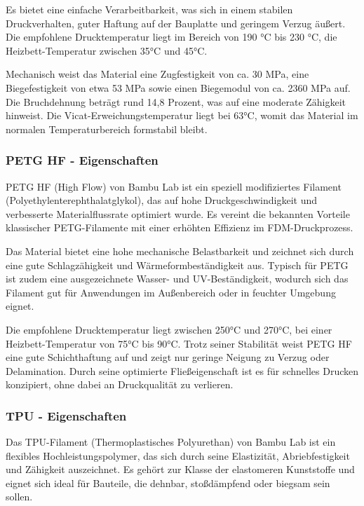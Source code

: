 \documentclass[a4paper,12pt]{article}
\begin{document}
Es bietet eine einfache Verarbeitbarkeit, was sich in einem stabilen Druckverhalten, guter Haftung auf der Bauplatte und geringem Verzug äußert. Die empfohlene Drucktemperatur liegt im Bereich von 190 °C bis 230 °C, die Heizbett-Temperatur zwischen 35°C und 45°C.

Mechanisch weist das Material eine Zugfestigkeit von ca. 30 MPa, eine Biegefestigkeit von etwa 53 MPa sowie einen Biegemodul von ca. 2360 MPa auf. Die Bruchdehnung beträgt rund 14,8 Prozent, was auf eine moderate Zähigkeit hinweist. \newline Die Vicat-Erweichungstemperatur liegt bei 63°C, womit das Material im normalen Temperaturbereich formstabil bleibt.\cite{Bambu_Lab_Filament_PLA}


\subsubsection{PETG HF - Eigenschaften}
\label{sec:PETG HF}

PETG HF (High Flow) von Bambu Lab ist ein speziell modifiziertes Filament (Polyethylenterephthalatglykol), das auf hohe Druckgeschwindigkeit und verbesserte Materialflussrate optimiert wurde. Es vereint die bekannten Vorteile klassischer PETG-Filamente mit einer erhöhten Effizienz im FDM-Druckprozess.

Das Material bietet eine hohe mechanische Belastbarkeit und zeichnet sich durch eine gute Schlagzähigkeit und Wärmeformbeständigkeit aus. Typisch für PETG ist zudem eine ausgezeichnete Wasser- und UV-Beständigkeit, wodurch sich das Filament gut für Anwendungen im Außenbereich oder in feuchter Umgebung eignet.

Die empfohlene Drucktemperatur liegt zwischen 250°C und 270°C, bei einer Heizbett-Temperatur von 75°C bis 90°C. Trotz seiner Stabilität weist PETG HF eine gute Schichthaftung auf und zeigt nur geringe Neigung zu Verzug oder Delamination. Durch seine optimierte Fließeigenschaft ist es für schnelles Drucken konzipiert, ohne dabei an Druckqualität zu verlieren.\cite{Bambu_Lab_Filament_PETG_HF}\newline

\newpage

\subsubsection{TPU - Eigenschaften}
\label{sec:TPU}

Das TPU-Filament (Thermoplastisches Polyurethan) von Bambu Lab ist ein flexibles Hochleistungspolymer, das sich durch seine Elastizität, Abriebfestigkeit und Zähigkeit auszeichnet. Es gehört zur Klasse der elastomeren Kunststoffe und eignet sich ideal für Bauteile, die dehnbar, stoßdämpfend oder biegsam sein sollen.
\end{document}
